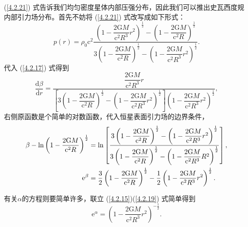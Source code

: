 \documentclass[11pt, a4paper, oneside, onecolumn]{ctexart}
\numberwithin{equation}{subsection}
\begin{document}
(\ref{4.2.21}) 式告诉我们均匀密度星体内部压强分布，因此我们可以推出史瓦西度规内部引力场分布。首先不妨将 (\ref{4.2.21}) 式改写成如下形式：
\begin{equation}
p\left(r\right)=\rho_{0}\mathrm{c}^{2}\frac{\left(1-\dfrac{2\mathrm{G}M}{\mathrm{c}^{2}R^{3}}r^{2}\right)^{\frac{1}{2}}-\left(1-\dfrac{2\mathrm{G}M}{\mathrm{c}^{2}R}\right)^{\frac12}}{3\left(1-\dfrac{2\mathrm{G}M}{\mathrm{c}^{2}R}\right)^{\frac12}-\left(1-\dfrac{2\mathrm{G}M}{\mathrm{c}^{2}R^{3}}r^{2}\right)^{\frac{1}{2}}}.
\end{equation}
代入 (\ref{4.2.17}) 式得到
\begin{equation}
\frac{\mathrm{d}\beta}{\mathrm{d}r}=\frac{\dfrac{2\mathrm{G}M}{\mathrm{c}^{2}R^{3}}r}{\left[3\left(1-\dfrac{2\mathrm{G}M}{\mathrm{c}^{2}R}\right)^{\frac12}-\left(1-\dfrac{2\mathrm{G}M}{\mathrm{c}^{2}R^{3}}r^{2}\right)^{\frac{1}{2}}\right]\left(1-\dfrac{2\mathrm{G}M}{\mathrm{c}^{2}R^{3}}r^{2}\right)^{\frac{1}{2}}},
\end{equation}
右侧原函数是个简单的对数函数，代入恒星表面引力场的边界条件，
\begin{align}
\beta-\ln\left(1-\frac{2\mathrm{G}M}{\mathrm{c}^{2}R}\right)^{\frac{1}{2}}&=\ln\left[\dfrac{3\left(1-\dfrac{2\mathrm{G}M}{\mathrm{c}^{2}R}\right)^{\frac12}-\left(1-\dfrac{2\mathrm{G}M}{\mathrm{c}^{2}R^{3}}r^{2}\right)^{\frac{1}{2}}}{3\left(1-\dfrac{2\mathrm{G}M}{\mathrm{c}^{2}R}\right)^{\frac12}-\left(1-\dfrac{2\mathrm{G}M}{\mathrm{c}^{2}R^{3}}R^{2}\right)^{\frac{1}{2}}}\right],\notag\\
\mathrm{e}^{\beta}&=\frac{3}{2}\left(1-\dfrac{2\mathrm{G}M}{\mathrm{c}^{2}R}\right)^{\frac12}-\frac{1}{2}\left(1-\dfrac{2\mathrm{G}M}{\mathrm{c}^{2}R^{3}}r^{2}\right)^{\frac{1}{2}}.
\end{align}

有关$\alpha$的方程则要简单许多，联立 (\ref{4.2.15})(\ref{4.2.19}) 式简单得到
\begin{equation}
\mathrm{e}^{\alpha}=\left(1-\frac{2\mathrm{G}M}{\mathrm{c}^{2}R^{3}}r^{2}\right)^{-\frac{1}{2}}.
\end{equation}
\end{document}
